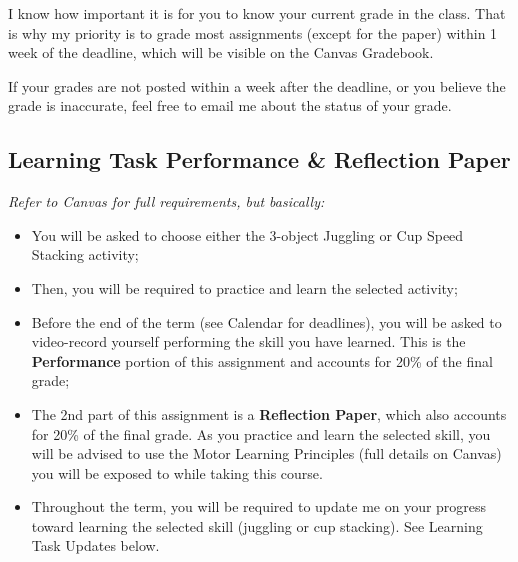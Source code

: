 \documentclass[
  letterpaper,
  DIV=11,
  numbers=noendperiod]{scrartcl}
\providecommand{\tightlist}{%
  \setlength{\itemsep}{0pt}\setlength{\parskip}{0pt}}\usepackage{longtable,booktabs,array}
\begin{document}
\begin{tcolorbox}[enhanced jigsaw, colbacktitle=quarto-callout-note-color!10!white, rightrule=.15mm, opacityback=0, colframe=quarto-callout-note-color-frame, leftrule=.75mm, breakable, bottomrule=.15mm, arc=.35mm, opacitybacktitle=0.6, title=\textcolor{quarto-callout-note-color}{\faInfo}\hspace{0.5em}{Note}, titlerule=0mm, toptitle=1mm, bottomtitle=1mm, left=2mm, toprule=.15mm, colback=white, coltitle=black]

I know how important it is for you to know your current grade in the
class. That is why my priority is to grade most assignments (except for
the paper) within 1 week of the deadline, which will be visible on the
Canvas Gradebook.

If your grades are not posted within a week after the deadline, or you
believe the grade is inaccurate, feel free to email me about the status
of your grade.

\end{tcolorbox}

\hypertarget{learning-task-performance-reflection-paper}{%
\subsection{Learning Task Performance \& Reflection
Paper}\label{learning-task-performance-reflection-paper}}

\emph{Refer to Canvas for full requirements, but basically:}

\begin{itemize}
\tightlist
\item
  You will be asked to choose either the 3-object Juggling or Cup Speed
  Stacking activity;
\item
  Then, you will be required to practice and learn the selected
  activity;
\item
  Before the end of the term (see Calendar for deadlines), you will be
  asked to video-record yourself performing the skill you have learned.
  This is the \textbf{Performance} portion of this assignment and
  accounts for 20\% of the final grade;
\item
  The 2nd part of this assignment is a \textbf{Reflection Paper}, which
  also accounts for 20\% of the final grade. As you practice and learn
  the selected skill, you will be advised to use the Motor Learning
  Principles (full details on Canvas) you will be exposed to while
  taking this course.
\item
  Throughout the term, you will be required to update me on your
  progress toward learning the selected skill (juggling or cup
  stacking). See Learning Task Updates below.
\end{itemize}
\end{document}
